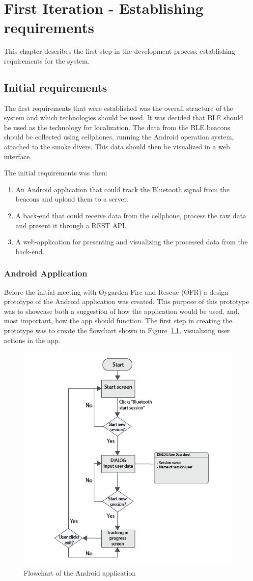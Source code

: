 \documentclass[../Main/thesis.tex]{subfiles}
\begin{document}
\chapter{First Iteration  - Establishing requirements}
\label{ch:requirements}
This chapter describes the first step in the development process: establishing requirements for the system. 

\section{Initial requirements}
The first requirements that were established was the overall structure of the system and which technologies should be used.
It was decided that BLE should be used as the technology for localization.
The data from the BLE beacons should be collected using cellphones, running the Android operation system, attached to the smoke divers.
This data should then be visualized in a web interface.

The initial requirements was then:
\begin{enumerate}
	\item An Android application that could track the Bluetooth signal from the beacons and upload them to a server.
	\item A back-end that could receive data from the cellphone, process the raw data and present it through a REST API.
	\item A web-application for presenting and visualizing the processed data from the back-end.
\end{enumerate}

\subsection{Android Application}
Before the initial meeting with Øygarden Fire and Rescue (ØFR) a design-prototype of the Android application was created. 
This purpose of this prototype was to showcase both a suggestion of how the application would be used, and, most important, how the app should function.
The first step in creating the prototype was to create the flowchart shown in Figure~\ref{fig:flow-app-1}, visualizing user actions in the app.

\begin{figure}[h]
	\centering
	\includegraphics[width=0.6\linewidth]{../fig/flow_wire_app_1}
	\caption{Flowchart of the Android application}
	\label{fig:flow-app-1}
\end{figure}
\end{document}
